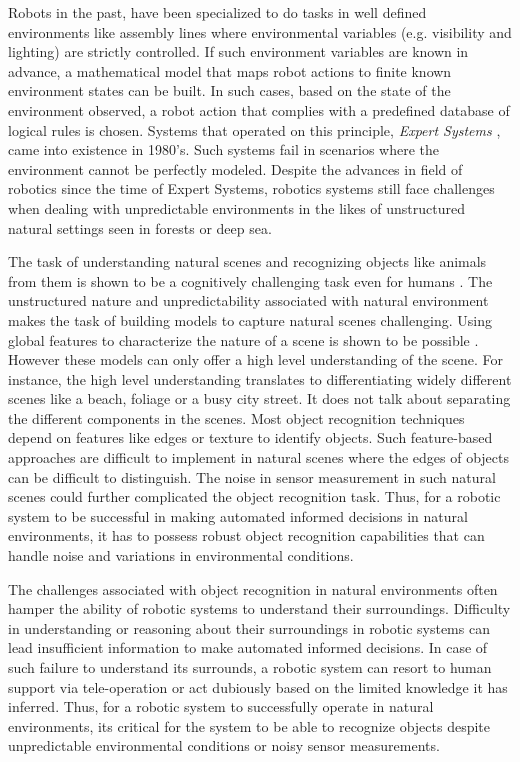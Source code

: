 \documentclass {udthesis}
\begin{document}
Robots in the past, have been specialized to do tasks in well defined environments like assembly lines where environmental variables (e.g. visibility and lighting) are strictly controlled. If such environment variables are known in advance, a mathematical model that maps robot actions to finite known environment states can be built. In such cases, based on the state of the environment observed, a robot action that complies with a predefined database of logical rules is chosen. Systems that operated on this principle, \emph{Expert Systems} 
\cite{russel}, came into existence in 1980's. Such systems fail in scenarios where the environment cannot be perfectly modeled. Despite the advances in field of robotics since the time of Expert Systems, robotics systems still face challenges when dealing with unpredictable environments in the likes of unstructured natural settings seen in forests or deep sea.

The task of understanding natural scenes and recognizing objects like animals from them is shown to be a cognitively challenging task 
even for humans \cite{wichmann}. The unstructured nature and unpredictability associated with natural environment makes the task of 
building models to capture natural scenes challenging.
Using global features to characterize the nature of a scene is shown to be possible \cite{olivia}. However these models can only offer a high level understanding
of the scene. For instance, the high level understanding translates to differentiating widely different scenes like a beach, foliage or a busy city street. It does not talk about separating the different components in the scenes. Most object recognition techniques depend on features like edges or texture to identify objects. Such feature-based approaches are difficult to implement in natural scenes where the edges of objects can be difficult to distinguish.
The noise in sensor measurement in such natural scenes could further complicated the object recognition task. 
Thus, for a robotic system to be
successful in making automated informed decisions in natural environments, it has to possess robust object recognition capabilities that can handle noise and variations in environmental conditions.

The challenges associated with object recognition in natural environments often hamper the ability of robotic systems to understand their surroundings.
Difficulty in understanding or reasoning about their surroundings in robotic systems can lead 
insufficient information to make automated 
informed decisions. In case of such failure to understand its surrounds, a robotic system can resort to human support via tele-operation or 
act dubiously based on the limited knowledge it has inferred. Thus, for a robotic system to successfully operate in natural environments, its critical for the system to be able to recognize objects despite unpredictable environmental conditions or noisy sensor measurements.
\end{document}

